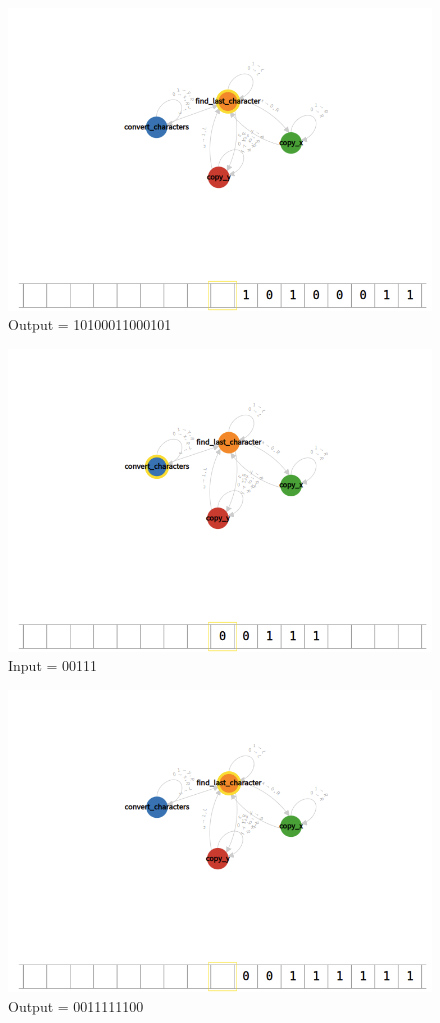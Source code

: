 \documentclass[12pt]{article}
\begin{document}
\begin{figure}[H]
    \caption{Output = 10100011000101}
    \centering
    \includegraphics[width=12cm]{Q2/10100011000101.png}
\end{figure}
\begin{figure}
    \caption{Input = 00111}
    \centering
    \includegraphics[width=12cm]{Q2/00111.png}
\end{figure}
\begin{figure}
    \caption{Output = 0011111100}
    \centering
    \includegraphics[width=12cm]{Q2/0011111100.png}
\end{figure}
\newpage
\end{document}
